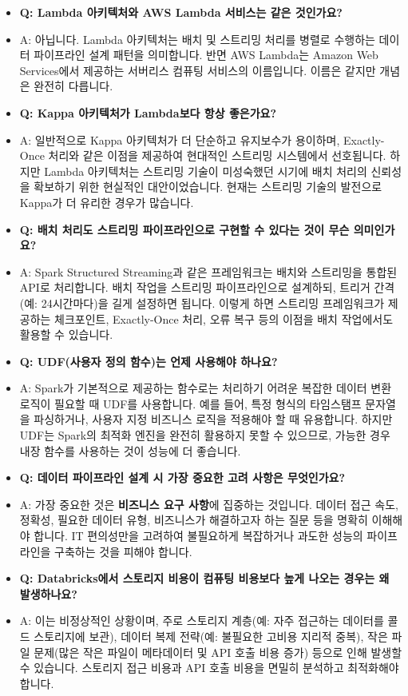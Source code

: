 \documentclass[11pt,a4paper]{article}
\begin{document}
\begin{itemize}
    \item \textbf{Q: Lambda 아키텍처와 AWS Lambda 서비스는 같은 것인가요?}
    \item A: 아닙니다. Lambda 아키텍처는 배치 및 스트리밍 처리를 병렬로 수행하는 데이터 파이프라인 설계 패턴을 의미합니다. 반면 AWS Lambda는 Amazon Web Services에서 제공하는 서버리스 컴퓨팅 서비스의 이름입니다. 이름은 같지만 개념은 완전히 다릅니다.

    \item \textbf{Q: Kappa 아키텍처가 Lambda보다 항상 좋은가요?}
    \item A: 일반적으로 Kappa 아키텍처가 더 단순하고 유지보수가 용이하며, Exactly-Once 처리와 같은 이점을 제공하여 현대적인 스트리밍 시스템에서 선호됩니다. 하지만 Lambda 아키텍처는 스트리밍 기술이 미성숙했던 시기에 배치 처리의 신뢰성을 확보하기 위한 현실적인 대안이었습니다. 현재는 스트리밍 기술의 발전으로 Kappa가 더 유리한 경우가 많습니다.

    \item \textbf{Q: 배치 처리도 스트리밍 파이프라인으로 구현할 수 있다는 것이 무슨 의미인가요?}
    \item A: Spark Structured Streaming과 같은 프레임워크는 배치와 스트리밍을 통합된 API로 처리합니다. 배치 작업을 스트리밍 파이프라인으로 설계하되, 트리거 간격(예: 24시간마다)을 길게 설정하면 됩니다. 이렇게 하면 스트리밍 프레임워크가 제공하는 체크포인트, Exactly-Once 처리, 오류 복구 등의 이점을 배치 작업에서도 활용할 수 있습니다.

    \item \textbf{Q: UDF(사용자 정의 함수)는 언제 사용해야 하나요?}
    \item A: Spark가 기본적으로 제공하는 함수로는 처리하기 어려운 복잡한 데이터 변환 로직이 필요할 때 UDF를 사용합니다. 예를 들어, 특정 형식의 타임스탬프 문자열을 파싱하거나, 사용자 지정 비즈니스 로직을 적용해야 할 때 유용합니다. 하지만 UDF는 Spark의 최적화 엔진을 완전히 활용하지 못할 수 있으므로, 가능한 경우 내장 함수를 사용하는 것이 성능에 더 좋습니다.

    \item \textbf{Q: 데이터 파이프라인 설계 시 가장 중요한 고려 사항은 무엇인가요?}
    \item A: 가장 중요한 것은 \textbf{비즈니스 요구 사항}에 집중하는 것입니다. 데이터 접근 속도, 정확성, 필요한 데이터 유형, 비즈니스가 해결하고자 하는 질문 등을 명확히 이해해야 합니다. IT 편의성만을 고려하여 불필요하게 복잡하거나 과도한 성능의 파이프라인을 구축하는 것을 피해야 합니다.

    \item \textbf{Q: Databricks에서 스토리지 비용이 컴퓨팅 비용보다 높게 나오는 경우는 왜 발생하나요?}
    \item A: 이는 비정상적인 상황이며, 주로 스토리지 계층(예: 자주 접근하는 데이터를 콜드 스토리지에 보관), 데이터 복제 전략(예: 불필요한 고비용 지리적 중복), 작은 파일 문제(많은 작은 파일이 메타데이터 및 API 호출 비용 증가) 등으로 인해 발생할 수 있습니다. 스토리지 접근 비용과 API 호출 비용을 면밀히 분석하고 최적화해야 합니다.
\end{itemize}
\end{document}
